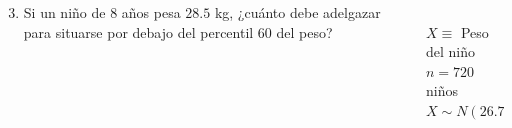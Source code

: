 \documentclass[aspectratio=149,10pt,xcolor=dvipsnames,t]{beamer}
\begin{document}
	
\begin{frame}
\begin{columns}
\begin{column}[T]{0.75\textwidth}
\begin{enumerate}
\setcounter{enumi}{2}
\item Si un niño de 8 años pesa $28.5$ kg, ¿cuánto debe adelgazar para situarse por debajo del percentil 60 del peso?
\end{enumerate}
\end{column}
\begin{column}[T]{0.25\textwidth}
\\
$X\equiv$ Peso del niño\\
$n=720$ niños\\
$X\sim N(26.78\,,\,3.25)$
\end{column}
\end{columns} 
\end{frame}	
	
	
\end{document}
